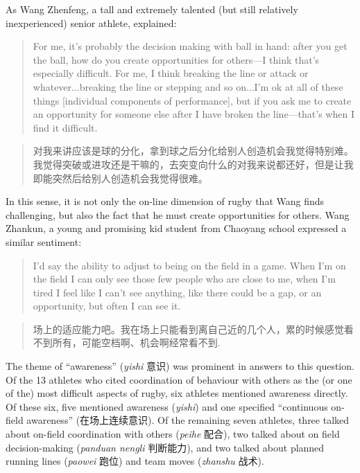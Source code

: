 \begin{CJK}{UTF8}{gbsn}
As Wang Zhenfeng, a tall and extremely talented (but still relatively inexperienced) senior athlete, explained:

\begin{quote}
  For me, it's probably the decision making with ball in hand: after you get the ball, how do you create opportunities for others---I think that's especially difficult.  For me, I think breaking the line or attack or whatever...breaking the line or stepping and so on...I'm ok at all of these things [individual components of performance], but if you ask me to create an opportunity for someone else after I have broken the line---that's when I find it difficult.
\end{quote}

\begin{quote}
  对我来讲应该是球的分化，拿到球之后分化给别人创造机会我觉得特别难。我觉得突破或进攻还是干嘛的，去突变向什么的对我来说都还好，但是让我即能突然后给别人创造机会我觉得很难。
\end{quote}

In this sense, it is not only the on-line dimension of rugby that Wang finds challenging, but also the fact that he must create opportunities for others.  Wang Zhankun, a young and promising kid student from Chaoyang school expressed a similar sentiment:

\begin{quote}
  I’d say the ability to adjust to being on the field in a game.  When I’m on the field I can only see those few people who are close to me, when I’m tired I feel like I can’t see anything, like there could be a gap, or an opportunity, but often I can see it.
\end{quote}

\begin{quote}
  场上的适应能力吧。我在场上只能看到离自己近的几个人，累的时候感觉看不到所有，可能空档啊、机会啊经常看不到.
\end{quote}

The theme of ``awareness'' (\textit{yishi} 意识) was prominent in answers to this question. Of the 13 athletes who cited coordination of behaviour with others as the (or one of the) most difficult aspects of rugby,  six athletes mentioned awareness directly.  Of these six, five mentioned awareness (\textit{yishi}) and one specified ``continuous on-field awareness'' (在场上连续意识).  Of the remaining seven athletes, three talked about on-field coordination with others (\textit{peihe} 配合), two talked about on field decision-making (\textit{panduan nengli} 判断能力), and two talked about planned running lines (\textit{paowei} 跑位) and team moves (\textit{zhanshu} 战术).


\end{CJK}
